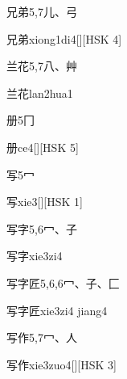 \begin{entry}{兄弟}{5,7}{⼉、⼸}
  \begin{phonetics}{兄弟}{xiong1di4}[][HSK 4]
  \end{phonetics}
\end{entry}

\begin{entry}{兰花}{5,7}{⼋、⾋}
  \begin{phonetics}{兰花}{lan2hua1}
  \end{phonetics}
\end{entry}

\begin{entry}{册}{5}{⼌}
  \begin{phonetics}{册}{ce4}[][HSK 5]
  \end{phonetics}
\end{entry}

\begin{entry}{写}{5}{⼍}
  \begin{phonetics}{写}{xie3}[][HSK 1]
  \end{phonetics}
\end{entry}

\begin{entry}{写字}{5,6}{⼍、⼦}
  \begin{phonetics}{写字}{xie3zi4}
  \end{phonetics}
\end{entry}

\begin{entry}{写字匠}{5,6,6}{⼍、⼦、⼕}
  \begin{phonetics}{写字匠}{xie3zi4 jiang4}
  \end{phonetics}
\end{entry}

\begin{entry}{写作}{5,7}{⼍、⼈}
  \begin{phonetics}{写作}{xie3zuo4}[][HSK 3]
  \end{phonetics}
\end{entry}

